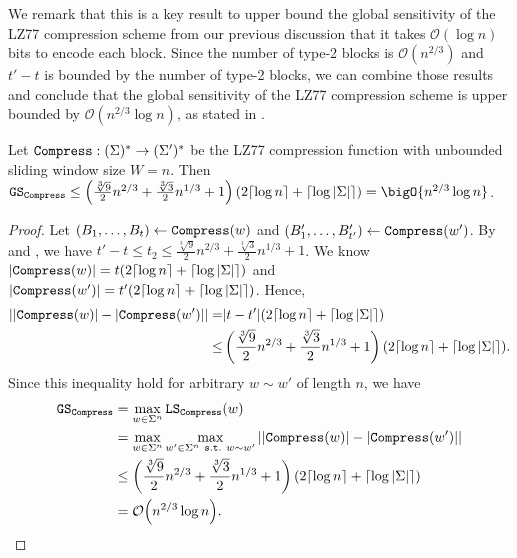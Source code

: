 We remark that this is a key result to upper bound the global sensitivity of the LZ77 compression scheme from our previous discussion that it takes $\mathcal{O}(\log n)$ bits to encode each block. Since the number of type-2 blocks is $\mathcal{O}(n^{2/3})$ and $t'-t$ is bounded by the number of type-2 blocks, we can combine those results and conclude that the global sensitivity of the LZ77 compression scheme is upper bounded by $\mathcal{O}(n^{2/3}\log n)$, as stated in .

\begin{theorem}
    Let $\mathtt{Compress}:(\Sigma)^*\rightarrow(\Sigma')^*$ be the LZ77 compression function with unbounded sliding window size $W=n$. Then $\GS_\compress\leq \left(\frac{\sqrt[3]{9}}{2} n^{2/3} + \frac{\sqrt[3]{3}}{2} n^{1/3} + 1\right) (2\lceil\log n\rceil+\lceil\log|\Sigma|\rceil) = \bigO{n^{2/3}\log n}$.
\end{theorem}
\begin{proof}
    Let $(B_1,\ldots,B_t)\gets\mathtt{Compress}(w)$ and $(B'_1,\ldots,B'_{t'})\gets\mathtt{Compress}(w')$.
    By  and , we have $t'-t\leq t_2\leq \frac{\sqrt[3]{9}}{2} n^{2/3} + \frac{\sqrt[3]{3}}{2} n^{1/3} + 1$. We know $|\mathtt{Compress}(w)|=t(2\lceil\log n\rceil+\lceil\log|\Sigma|\rceil)$ and $|\mathtt{Compress}(w')|=t'(2\lceil\log n\rceil+\lceil\log|\Sigma|\rceil)$. Hence,%
\begin{align*}
    \left|\left| \mathtt{Compress}(w) \right| - \left| \mathtt{Compress}(w') \right|\right| =& |t-t'|(2\lceil\log n\rceil+\lceil\log|\Sigma|\rceil) \nonumber \\
    \leq & \left(\frac{\sqrt[3]{9}}{2} n^{2/3} + \frac{\sqrt[3]{3}}{2} n^{1/3} + 1\right) (2\lceil\log n\rceil+\lceil\log|\Sigma|\rceil) .
\end{align*}
Since this inequality hold for arbitrary $w\sim w'$ of length $n$, we have
\begin{align*}
    \mathtt{GS}_{\mathtt{Compress}} &= \max_{w \in \Sigma^n} \mathtt{LS}_{\mathtt{Compress}}(w)\\
    &= \max_{w \in \Sigma^n}\max_{w' \in \Sigma^n~\mathtt{s.t.}~w\sim w'} \left| |\compress(w)| - |\compress(w')| \right|\\
    &\leq \left(\frac{\sqrt[3]{9}}{2} n^{2/3} + \frac{\sqrt[3]{3}}{2} n^{1/3} + 1\right) (2\lceil\log n\rceil+\lceil\log|\Sigma|\rceil)\\
    &=\O{n^{2/3}\log n}.\qedhere
\end{align*}
\end{proof}


